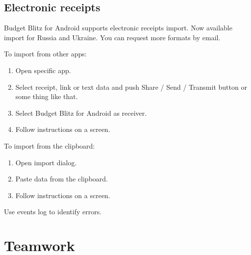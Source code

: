 \documentclass[a4paper,10pt,english]{sphinxmanual}
\begin{document}
\noindent{}
\noindent{}


\section{Electronic receipts}
\label{\detokenize{import:electronic-receipts}}
\sphinxAtStartPar
Budget Blitz for Android supports electronic receipts import. Now available import for Russia and Ukraine. You can request more formats by email.

\sphinxAtStartPar
To import from other apps:
\begin{enumerate}
%
\item {} 
\sphinxAtStartPar
Open specific app.

\item {} 
\sphinxAtStartPar
Select receipt, link or text data and push Share / Send / Transmit button or some thing like that.

\item {} 
\sphinxAtStartPar
Select Budget Blitz for Android as receiver.

\item {} 
\sphinxAtStartPar
Follow instructions on a screen.

\end{enumerate}

\sphinxAtStartPar
To import from the clipboard:
\begin{enumerate}
%
\item {} 
\sphinxAtStartPar
Open import dialog.

\item {} 
\sphinxAtStartPar
Paste data from the clipboard.

\item {} 
\sphinxAtStartPar
Follow instructions on a screen.

\end{enumerate}

\sphinxAtStartPar
Use events log to identify errors.

\sphinxstepscope


\chapter{Teamwork}
\label{\detokenize{teamwork:teamwork}}\label{\detokenize{teamwork:chapter-teamwork}}\label{\detokenize{teamwork::doc}}
\end{document}
